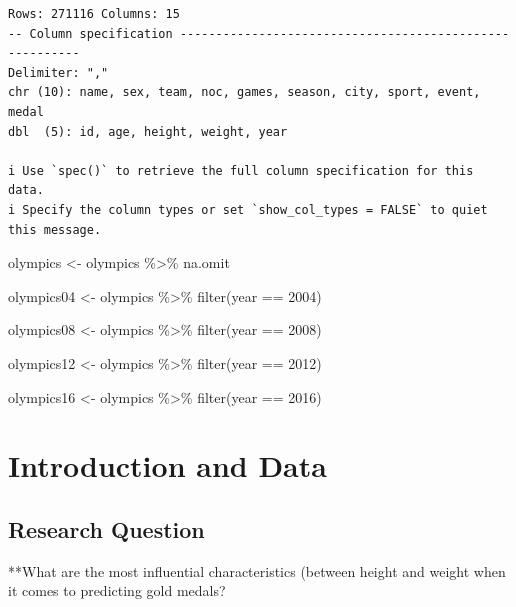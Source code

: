\documentclass[
  letterpaper,
  DIV=11,
  numbers=noendperiod]{scrartcl}
\newenvironment{Shaded}{\begin{snugshade}}{\end{snugshade}}
\newcommand{\DecValTok}[1]{\textcolor[rgb]{0.68,0.00,0.00}{#1}}
\newcommand{\FunctionTok}[1]{\textcolor[rgb]{0.28,0.35,0.67}{#1}}
\newcommand{\NormalTok}[1]{\textcolor[rgb]{0.00,0.23,0.31}{#1}}
\newcommand{\OtherTok}[1]{\textcolor[rgb]{0.00,0.23,0.31}{#1}}
\newcommand{\SpecialCharTok}[1]{\textcolor[rgb]{0.37,0.37,0.37}{#1}}
\begin{document}
\begin{verbatim}
Rows: 271116 Columns: 15
-- Column specification --------------------------------------------------------
Delimiter: ","
chr (10): name, sex, team, noc, games, season, city, sport, event, medal
dbl  (5): id, age, height, weight, year

i Use `spec()` to retrieve the full column specification for this data.
i Specify the column types or set `show_col_types = FALSE` to quiet this message.
\end{verbatim}

\begin{Shaded}
\begin{Highlighting}[]
\NormalTok{olympics }\OtherTok{\textless{}{-}}\NormalTok{ olympics }\SpecialCharTok{\%\textgreater{}\%} 
\NormalTok{ na.omit}

\NormalTok{olympics04 }\OtherTok{\textless{}{-}}\NormalTok{ olympics }\SpecialCharTok{\%\textgreater{}\%} 
  \FunctionTok{filter}\NormalTok{(year }\SpecialCharTok{==} \DecValTok{2004}\NormalTok{)}

\NormalTok{olympics08 }\OtherTok{\textless{}{-}}\NormalTok{ olympics }\SpecialCharTok{\%\textgreater{}\%} 
  \FunctionTok{filter}\NormalTok{(year }\SpecialCharTok{==} \DecValTok{2008}\NormalTok{)}

\NormalTok{olympics12 }\OtherTok{\textless{}{-}}\NormalTok{ olympics }\SpecialCharTok{\%\textgreater{}\%} 
  \FunctionTok{filter}\NormalTok{(year }\SpecialCharTok{==} \DecValTok{2012}\NormalTok{)}

\NormalTok{olympics16 }\OtherTok{\textless{}{-}}\NormalTok{ olympics }\SpecialCharTok{\%\textgreater{}\%} 
  \FunctionTok{filter}\NormalTok{(year }\SpecialCharTok{==} \DecValTok{2016}\NormalTok{)}
\end{Highlighting}
\end{Shaded}

\hypertarget{introduction-and-data}{%
\section{Introduction and Data}\label{introduction-and-data}}

\hypertarget{research-question}{%
\subsection{Research Question}\label{research-question}}

**What are the most influential characteristics (between height and
weight when it comes to predicting gold medals?
\end{document}
